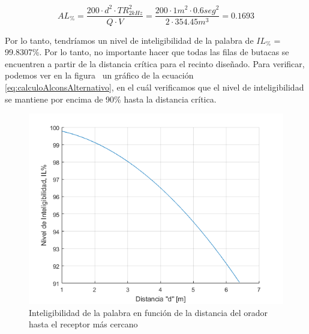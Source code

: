 \begin{equation*}
    \boxed{ AL_{\%} = \frac{200 \cdot d^2 \cdot TR_{2kHz}^2}{Q\cdot V} = \frac{200 \cdot 1m^2 \cdot 0.6 seg^2}{2 \cdot 354.45m^3} = 0.1693 }
    \label{eq:calculoAlconsAlternativo}
\end{equation*}

\par Por lo tanto, tendríamos un nivel de inteligibilidad de la palabra de $IL_{\%}$ =  99.8307\%. Por lo tanto, no importante hacer que todas las filas de butacas se encuentren a partir de la distancia crítica para el recinto diseñado. Para verificar, podemos ver en la figura~ un gráfico de la ecuación~ \eqref{eq:calculoAlconsAlternativo}, en el cuál verificamos que el nivel de inteligibilidad se mantiene por encima de 90\% hasta la distancia crítica.

\begin{figure}[H]
	\centering
	\includegraphics[width=1\textwidth]{./img/nivel_inteligibilidad.png}
	\caption{Inteligibilidad de la palabra en función de la distancia del orador hasta el receptor más cercano}
	\label{fig:nivel_inteligibilidad}
\end{figure}